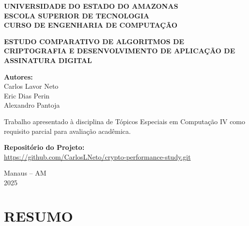 \documentclass[12pt,a4paper,oneside]{article}
\begin{document}
\begin{titlepage}
\centering
\vspace*{1cm}

{\fontsize{14}{16}\selectfont\bfseries\uppercase{Universidade do Estado do Amazonas}}\\
{\fontsize{14}{16}\selectfont\bfseries\uppercase{Escola Superior de Tecnologia}}\\
{\fontsize{14}{16}\selectfont\bfseries\uppercase{Curso de Engenharia de Computação}}\\

\vspace{3cm}

{\fontsize{14}{16}\selectfont\bfseries\uppercase{Estudo Comparativo de Algoritmos de Criptografia e Desenvolvimento de Aplicação de Assinatura Digital}}

\vspace{3cm}

{\fontsize{12}{14}\selectfont
\textbf{Autores:}\\
Carlos Lavor Neto\\
Eric Dias Perin\\
Alexandro Pantoja\\
}

\vspace{2cm}

{\fontsize{12}{14}\selectfont
Trabalho apresentado à disciplina de Tópicos Especiais em Computação IV como requisito parcial para avaliação acadêmica.

\vspace{0.5cm}
\textbf{Repositório do Projeto:}\\
\url{https://github.com/CarlosLNeto/crypto-performance-study.git}
}

\vfill

{\fontsize{12}{14}\selectfont
Manaus -- AM\\
2025
}

\end{titlepage}

\newpage
\section*{RESUMO}
\end{document}
